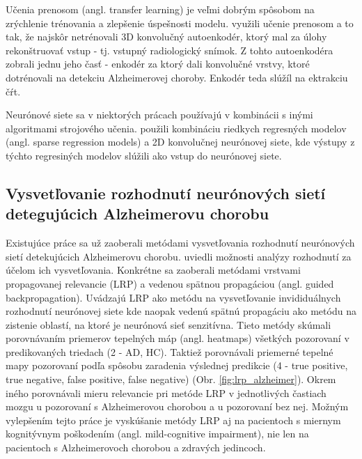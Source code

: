 Učenia prenosom (angl. transfer learning) je veľmi dobrým spôsobom na zrýchlenie trénovania a zlepšenie úspešnosti modelu. \citeauthor*{hosseini2016alzheimer} využili učenie prenosom a to tak, že najskôr netrénovali 3D konvolučný autoenkodér, ktorý mal za úlohy rekonštruovať vstup - tj. vstupný radiologický snímok. Z tohto autoenkodéra zobrali jednu jeho časť - enkodér za ktorý dali konvolučné vrstvy, ktoré dotrénovali na detekciu Alzheimerovej choroby. Enkodér teda slúžíl na ektrakciu čŕt.

Neurónové siete sa v niektorých prácach používajú v kombinácii s inými algoritmami strojového učenia. \citeauthor*{suk2017deep} použili kombináciu riedkych regresných modelov (angl. sparse regression models) a 2D konvolučnej neurónovej siete, kde výstupy z týchto regresiných modelov slúžili ako vstup do neurónovej siete.


\subsection{Vysvetľovanie rozhodnutí neurónových sietí detegujúcich Alzheimerovu chorobu \label{sec:ad_nn_explanation}}

Existujúce práce sa už zaoberali metódami vysvetľovania rozhodnutí neurónových sietí detekujúcich Alzheimerovu chorobu. \citeauthor{bohle2019layer} \citeyear{bohle2019layer} uviedli možnosti analýzy rozhodnutí za účelom ich vysvetľovania. Konkrétne sa zaoberali metódami vrstvami propagovanej relevancie (LRP) a vedenou spätnou propagáciou (angl. guided backpropagation). Uvádzajú LRP ako metódu na vysvetľovanie invididuálnych rozhodnutí neurónovej siete kde naopak vedenú spätnú propagáciu ako metódu na zistenie oblastí, na ktoré je neurónová sieť senzitívna. Tieto metódy skúmali porovnávaním priemerov tepelných máp (angl. heatmaps) všetkých pozorovaní v predikovaných triedach (2 - AD, HC). Taktiež porovnávali priemerné tepelné mapy pozorovaní podľa spôsobu zaradenia výslednej predikcie (4 - true positive, true negative, false positive, false negative) (Obr. \ref{fig:lrp_alzheimer}). Okrem iného porovnávali mieru relevancie pri metóde LRP v jednotlivých častiach mozgu u pozorovaní s Alzheimerovou chorobou a u pozorovaní bez nej. Možným vylepšením tejto práce je vyskúšanie metódy LRP aj na pacientoch s miernym kognitývnym poškodením (angl. mild-cognitive impairment), nie len na pacientoch s Alzheimerovoch chorobou a zdravých jedincoch.

